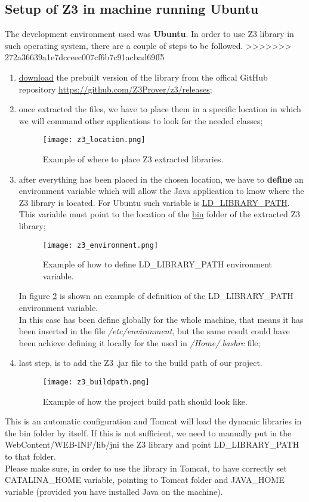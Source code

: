 \subsection{Setup of Z3 in machine running Ubuntu}
The development environment used was \textbf{Ubuntu}. In order to use Z3 library in such operating system, there are a couple of steps to be followed.
>>>>>>> 272a36639a1e7dcceec007cf6b7c91acbad69ff5
\begin{enumerate}
  \item \underline{download} the prebuilt version of the library from the offical GitHub repository \url{https://github.com/Z3Prover/z3/releases};
  \item once extracted the files, we have to place them in a specific location in which we will command other applications to look for the needed classes;
  \begin{figure}[!htb]
     \centering
     \texttt{[image: z3\_location.png]}
     \caption{Example of where to place Z3 extracted libraries.}\label{Fig:Z3Location}
  \end{figure}
  \item after everything has been placed in the chosen location, we have to \textbf{define} an environment variable which will allow the Java application to know where the Z3 library is located. For Ubuntu such variable is \underline{LD\_LIBRARY\_PATH}. This variable must point to the location of the \underline{bin} folder of the extracted Z3 library;
  \begin{figure}[!htb]
     \centering
     \texttt{[image: z3\_environment.png]}
     \caption{Example of how to define LD\_LIBRARY\_PATH environment variable.}\label{Fig:Z3Environment}
  \end{figure}
  In figure \ref{Fig:Z3Environment} is shown an example of definition of the LD\_LIBRARY\_PATH environment variable. \\
  In this case has been define globally for the whole machine, that means it has been inserted in the file \textit{/etc/environment}, but the same result could have been achieve defining it locally for the used in \textit{/Home/.bashrc} file;
  \item last step, is to add the Z3 .jar file to the build path of our project.
  \begin{figure}[!htb]
     \centering
     \texttt{[image: z3\_buildpath.png]}
     \caption{Example of how the project build path should look like.}\label{Fig:Z3BuildPath}
  \end{figure}
\end{enumerate}
This is an automatic configuration and Tomcat will load the dynamic libraries in the bin folder by itself. If this is not sufficient, we need to manually put in the WebContent/WEB-INF/lib/jni the Z3 library and point LD\_LIBRARY\_PATH to that folder.\\
Please make sure, in order to use the library in Tomcat, to have correctly set CATALINA\_HOME variable, pointing to Tomcat folder and JAVA\_HOME variable (provided you have installed Java on the machine).

